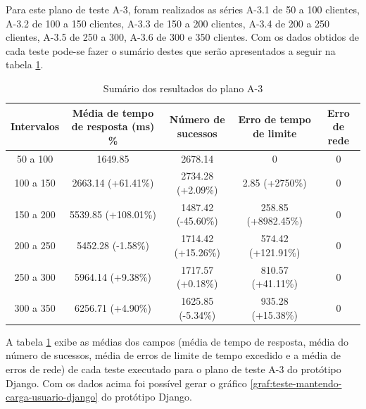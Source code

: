   Para este plano de teste A-3, foram realizados as séries A-3.1 de 50 a 100 clientes, A-3.2 de 100 a 150 clientes, A-3.3 de 150 a 200 clientes,
  A-3.4 de 200 a 250 clientes, A-3.5 de 250 a 300, A-3.6 de 300 e 350 clientes. Com os dados obtidos de cada teste pode-se fazer o sumário
  destes que serão apresentados a seguir na tabela \ref{tab:sumario-resultado-plano-teste-a-3}.
  
  \begin{table}[H]
    \centering
    \footnotesize
    \setlength{\abovecaptionskip}{0pt}
    \setlength{\belowcaptionskip}{0pt}
    \caption[Sumário dos resultados do plano A-3]{Sumário dos resultados do plano A-3}
    \label{tab:sumario-resultado-plano-teste-a-3}
    \begin{tabular}{c|c|c|c|c}
      \hline \hline
      Intervalos  & 	Média de tempo de resposta (ms) \% &	Número de sucessos & 	Erro de tempo de limite &	Erro de rede \\ 
      \hline \hline
      50 a 100 &		1649.85 &			2678.14 & 			0 &				0 \\
      100 a 150&		2663.14 (+61.41\%)&		2734.28 (+2.09\%)& 		2.85 (+2750\%) &		0 \\
      150 a 200&		5539.85 (+108.01\%)&		1487.42 (-45.60\%)& 		258.85 (+8982.45\%) &		0 \\
      200 a 250&		5452.28 (-1.58\%)&		1714.42 (+15.26\%)& 		574.42 (+121.91\%) &		0 \\
      250 a 300&		5964.14 (+9.38\%)&		1717.57 (+0.18\%)& 		810.57 (+41.11\%) &		0 \\
      300 a 350&		6256.71 (+4.90\%)&		1625.85 (-5.34\%)& 		935.28 (+15.38\%) &		0 \\
      \hline \hline
    \end{tabular}
  \end{table}
   
  A tabela \ref{tab:sumario-resultado-plano-teste-a-3} exibe as médias dos campos (média de tempo de resposta, 
  média do número de sucessos, média de erros de limite de tempo excedido e a média de erros de rede) de cada teste executado 
  para o plano de teste A-3 do protótipo Django.
  Com os dados acima foi possível gerar o gráfico \ref{graf:teste-mantendo-carga-usuario-django} do 
  protótipo Django.
  
